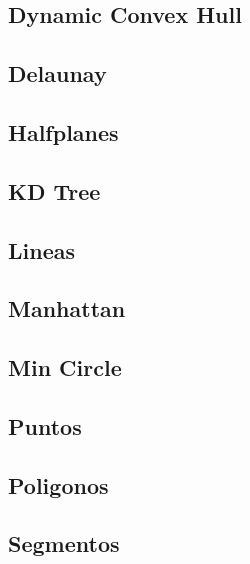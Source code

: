 \subsection{Dynamic Convex Hull}
\raggedbottom
\hrulefill
\subsection{Delaunay}
\raggedbottom
\hrulefill
\subsection{Halfplanes}
\raggedbottom
\hrulefill
\subsection{KD Tree}
\raggedbottom
\hrulefill
\subsection{Lineas}
\raggedbottom
\hrulefill
\subsection{Manhattan}
\raggedbottom
\hrulefill
\subsection{Min Circle}
\raggedbottom
\hrulefill
\subsection{Puntos}
\raggedbottom
\hrulefill
\subsection{Poligonos}
\raggedbottom
\hrulefill
\subsection{Segmentos}
\raggedbottom
\hrulefill
